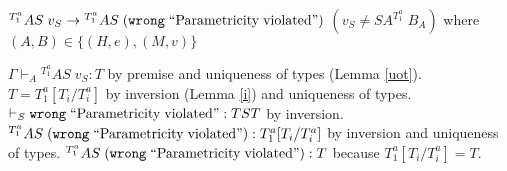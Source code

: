 \begin{case}
$^{T_{1}^{a}}AS\;v_{S}\rightarrow{^{T_{1}^{a}}A}S\;(\mathtt{wrong}\;\mathrm{``Parametricity\;violated"})$ $(v_{S}\neq SA^{T_{1}^{a}}\;B_{A})$ where $(A,B)\in\lbrace(H,e),(M,v)\rbrace$

$\Gamma\vdash_{A}{^{T_{1}^{a}}A}S\;v_{S}:T$ by premise and uniqueness of types (Lemma \ref{uot}).  $T=T_{1}^{a}[T_{i}/T_{i}^{a}]$ by inversion (Lemma \ref{i}) and uniqueness of types.  $\vdash_{S}\mathtt{wrong}\;\mathrm{``Parametricity\;violated"}:TST$ by inversion.  $^{T_{1}^{a}}AS\;(\mathtt{wrong}\;\mathrm{``Parametricity\;violated"}):T_{1}^{a}[T_{i}/T_{i}^{a}]$ by inversion and uniqueness of types.  $^{T_{1}^{a}}AS\;(\mathtt{wrong}\;\mathrm{``Parametricity\;violated"}):T$ because $T_{1}^{a}[T_{i}/T_{i}^{a}]=T$.
\end{case}